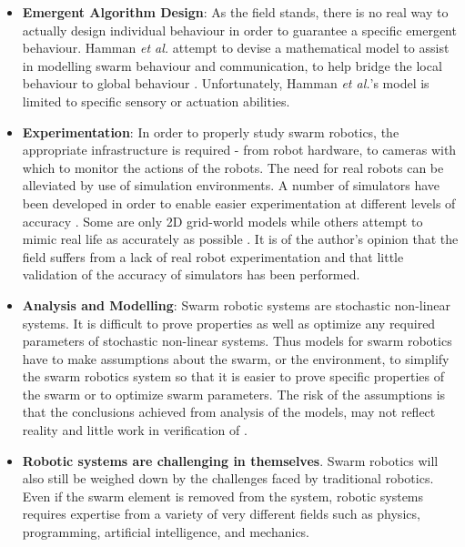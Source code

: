\begin{itemize}

\item \textbf{Emergent Algorithm Design}: As the field stands, there is no real way to actually design individual behaviour in order to guarantee a specific emergent behaviour. Hamman \textit{et al.} attempt to devise a mathematical model to assist in modelling swarm behaviour and communication, to help bridge the local behaviour to global behaviour \cite{hamann2008framework}. Unfortunately, Hamman \textit{et al.}'s model is limited to specific sensory or actuation abilities. 

\item \textbf{Experimentation}: In order to properly study swarm robotics, the appropriate infrastructure is required - from robot hardware, to cameras with which to monitor the actions of the robots. The need for real robots can be alleviated by use of simulation environments. A number of simulators have been developed in order to enable easier experimentation at different levels of accuracy \cite{vaughan2008massively,pinciroli2011argos, luke2005mason, bredeche2013roborobo}. Some are only 2D grid-world models while others attempt to mimic real life as accurately as possible \cite{michel1998webots}. It is of the author's opinion that the field suffers from a lack of real robot experimentation and that little validation of the accuracy of simulators has been performed. 

\item \textbf{Analysis and Modelling}: Swarm robotic systems are stochastic non-linear systems. It is difficult to prove properties as well as optimize any required parameters of stochastic non-linear systems. Thus models for swarm robotics have to make assumptions about the swarm, or the environment, to simplify the swarm robotics system so that it is easier to prove specific properties of the swarm or to optimize swarm parameters. The risk of the assumptions is that the conclusions achieved from analysis of the models, may not reflect reality and little work in verification of .

\item \textbf{Robotic systems are challenging in themselves}. Swarm robotics will also still be weighed down by the challenges faced by traditional robotics. Even if the swarm element is removed from the system, robotic systems requires expertise from a variety of very different fields such as physics, programming, artificial intelligence, and mechanics.
\end{itemize}

